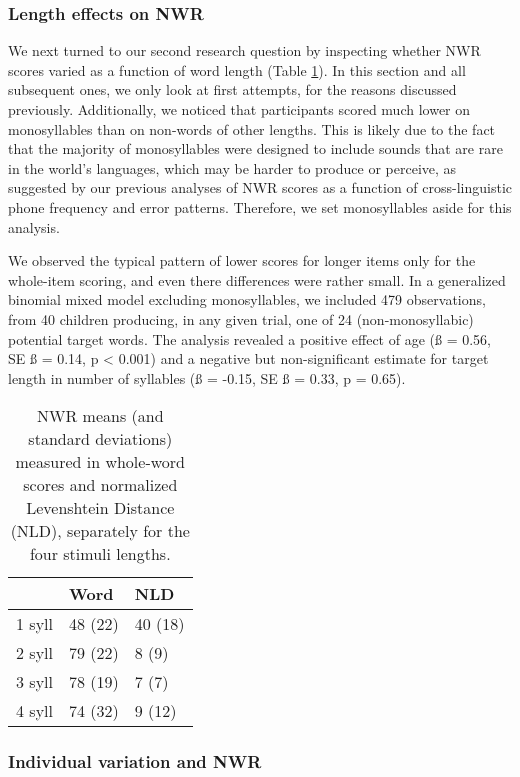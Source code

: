 \documentclass[
  english,
  ,man,floatsintext]{apa6}
\begin{document}
\hypertarget{length-effects-on-nwr-1}{%
\subsubsection{Length effects on NWR}\label{length-effects-on-nwr-1}}

We next turned to our second research question by inspecting whether NWR scores varied as a function of word length (Table \ref{tab:tablength}). In this section and all subsequent ones, we only look at first attempts, for the reasons discussed previously. Additionally, we noticed that participants scored much lower on monosyllables than on non-words of other lengths. This is likely due to the fact that the majority of monosyllables were designed to include sounds that are rare in the world's languages, which may be harder to produce or perceive, as suggested by our previous analyses of NWR scores as a function of cross-linguistic phone frequency and error patterns. Therefore, we set monosyllables aside for this analysis.

We observed the typical pattern of lower scores for longer items only for the whole-item scoring, and even there differences were rather small. In a generalized binomial mixed model excluding monosyllables, we included 479 observations, from 40 children producing, in any given trial, one of 24 (non-monosyllabic) potential target words. The analysis revealed a positive effect of age (ß = 0.56, SE ß = 0.14, p \textless{} 0.001) and a negative but non-significant estimate for target length in number of syllables (ß = -0.15, SE ß = 0.33, p = 0.65).

\begin{table}

\caption{\label{tab:tablength}NWR means (and standard deviations) measured in whole-word scores and normalized Levenshtein Distance (NLD), separately for the four stimuli lengths.}
\centering
\begin{tabular}[t]{lll}
\toprule
  & Word & NLD\\
\midrule
1 syll & 48 (22) & 40 (18)\\
2 syll & 79 (22) & 8 (9)\\
3 syll & 78 (19) & 7 (7)\\
4 syll & 74 (32) & 9 (12)\\
\bottomrule
\end{tabular}
\end{table}

\hypertarget{individual-variation-and-nwr}{%
\subsubsection{Individual variation and NWR}\label{individual-variation-and-nwr}}
\end{document}
